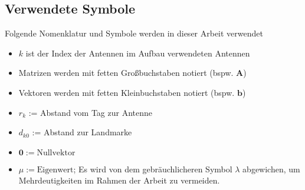 \newpage
\subsection*{Verwendete Symbole}
Folgende Nomenklatur und Symbole werden in dieser Arbeit verwendet
\begin{itemize}
	\item	$k$ ist der Index der Antennen im Aufbau verwendeten Antennen
	\item	Matrizen werden mit fetten Großbuchstaben notiert (bspw. $\mathbf{A}$)
	\item	Vektoren werden mit fetten Kleinbuchstaben notiert (bspw. $\mathbf{b}$)
	\item	$r_{k}$ := Abstand vom Tag zur Antenne
	\item	$d_{k0}$ := Abstand zur Landmarke
	\item	$\mathbf{0} := \text{Nullvektor}$
	\item	$\mu := \text{Eigenwert}$; Es wird von dem gebräuchlicheren Symbol $\lambda$ abgewichen, um Mehrdeutigkeiten im Rahmen der Arbeit zu vermeiden.	
\end{itemize}